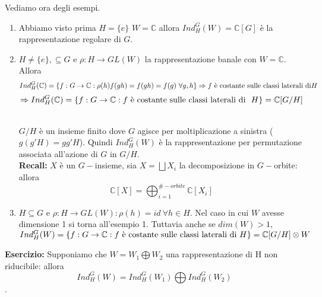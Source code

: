 \documentclass[11pt]{article}
\theoremstyle{plain}
\theoremstyle{definition}
\theoremstyle{remark}
\newcommand{\C}{\mathbb{C}}
\begin{document}
Vediamo ora degli esempi.
\begin{enumerate}
\item Abbiamo visto prima $H=\{e\}$ $W=\C$ allora $Ind_H^G(W)=\C[G]$ è la rappresentazione regolare di $G$. 
\item $H\neq \{e\},\subseteq G$ e $\rho:H\rightarrow GL(W)$ la rappresentazione banale con $W=\C$. Allora
\[Ind_H^G(\C)=\{f:G\rightarrow \C:\rho(h)f(gh)=f(gh)=f(g)\ \forall g,h\}\Rightarrow f \textup{ è costante sulle classi laterali di} H\]
\[\Rightarrow Ind_H^G(\C)=\{f:G\rightarrow \C:f \textup{ è costante sulle classi laterali di }\ H\}=\C[G/H]\]
\\
$G/H$ è un insieme finito dove $G$ agisce per moltiplicazione a sinistra ($g(g'H)=gg'H$). Quindi $Ind_H^G(W)$ è la rappresentazione per permutazione associata all'azione di $G$ in $G/H$. \\
\textbf{Recall:} $X$ è un $G-$insieme, sia $X= \bigsqcup X_i$ la decomposizione in $G-$orbite: allora 
\[\C[X]=\bigoplus_{i=1}^{\#-orbite} \C[X_i]\] 
\item $H\subseteq G$ e $\rho:H\rightarrow GL(W): \rho(h)=id\ \forall h\in H$. Nel caso in cui $W$ avesse dimensione 1 si torna all'esempio 1. Tuttavia anche se $dim(W)>1$, $Ind_H^G(W)=\{f:G\rightarrow \C:f \textup{ è costante sulle classi laterali di } H\}=\C[G/H]\otimes W$ 
\end{enumerate}
\textbf{Esercizio:} Supponiamo che $W=W_1\bigoplus W_2$ una rappresentazione di H non riducibile: allora 
\[Ind_H^G(W)=Ind_H^G(W_1)\bigoplus Ind_H^G(W_2)\].
\end{document}
